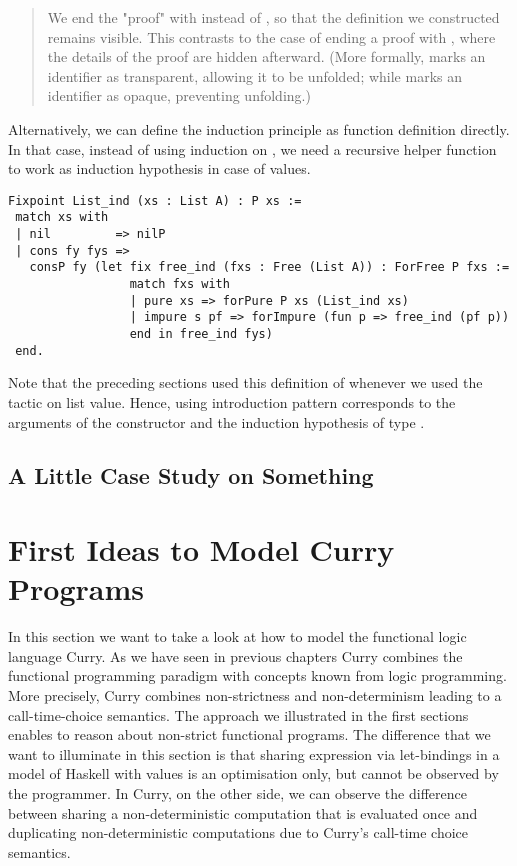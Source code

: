\begin{quote}
We end the "proof" with  instead of , so that
the definition we constructed remains visible.
This contrasts to the case of ending a proof with , where
the details of the proof are hidden afterward.
(More formally,  marks an identifier as transparent,
allowing it to be unfolded; while  marks an identifier as
opaque, preventing unfolding.)
\end{quote}

Alternatively, we can define the induction principle as function
definition directly.
In that case, instead of using induction on , we need a
recursive helper function  to work as induction
hypothesis in case of  values.

\begin{verbatim}
Fixpoint List_ind (xs : List A) : P xs :=
 match xs with
 | nil         => nilP
 | cons fy fys =>
   consP fy (let fix free_ind (fxs : Free (List A)) : ForFree P fxs :=
                 match fxs with
                 | pure xs => forPure P xs (List_ind xs)
                 | impure s pf => forImpure (fun p => free_ind (pf p))
                 end in free_ind fys)
 end.
\end{verbatim}

Note that the preceding sections used this definition of
 whenever we used the tactic  on list
value.
Hence, using introduction pattern \cinl{[ | fy fys IH ]} corresponds
to the arguments of the  constructor and the induction
hypothesis of type .

\subsection{A Little Case Study on Something}

\section{First Ideas to Model Curry Programs}

In this section we want to take a look at how to model the functional
logic language Curry.
As we have seen in previous chapters Curry combines the functional
programming paradigm with concepts known from logic programming.
More precisely, Curry combines non-strictness and non-determinism
leading to a call-time-choice semantics.
The approach we illustrated in the first sections enables to reason
about non-strict functional programs.
The difference that we want to illuminate in this section is that
sharing expression via let-bindings in a model of Haskell with
 values is an optimisation only, but cannot be
observed by the programmer.
In Curry, on the other side, we can observe the difference between
sharing a non-deterministic computation that is evaluated once and
duplicating non-deterministic computations due to Curry's call-time
choice semantics.

